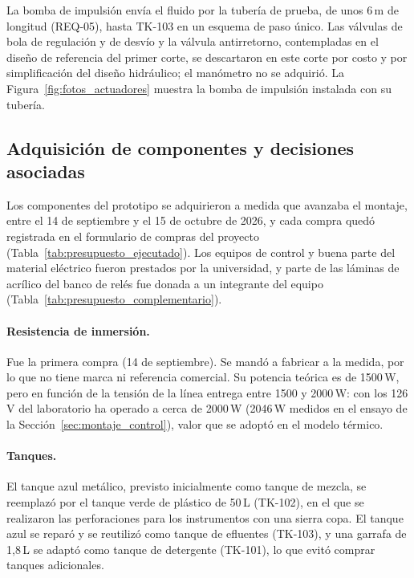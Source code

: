  La bomba de impulsión envía el fluido por la tubería de prueba, de unos 6\,m de longitud (REQ-05), hasta TK-103 en un esquema de paso único. Las válvulas de bola de regulación y de desvío y la válvula antirretorno, contempladas en el diseño de referencia del primer corte, se descartaron en este corte por costo y por simplificación del diseño hidráulico; el manómetro no se adquirió. La Figura~\ref{fig:fotos_actuadores} muestra la bomba de impulsión instalada con su tubería.
\subsection{Adquisición de componentes y decisiones asociadas}\label{sec:montaje_adquisiciones}

Los componentes del prototipo se adquirieron a medida que avanzaba el montaje, entre el 14 de septiembre y el 15 de octubre de 2026, y cada compra quedó registrada en el formulario de compras del proyecto (Tabla~\ref{tab:presupuesto_ejecutado}). Los equipos de control y buena parte del material eléctrico fueron prestados por la universidad, y parte de las láminas de acrílico del banco de relés fue donada a un integrante del equipo (Tabla~\ref{tab:presupuesto_complementario}).

\paragraph{Resistencia de inmersión.} Fue la primera compra (14 de septiembre). Se mandó a fabricar a la medida, por lo que no tiene marca ni referencia comercial. Su potencia teórica es de 1500\,W, pero en función de la tensión de la línea entrega entre 1500 y 2000\,W: con los 126\,V del laboratorio ha operado a cerca de 2000\,W (2046\,W medidos en el ensayo de la Sección~\ref{sec:montaje_control}), valor que se adoptó en el modelo térmico.

\paragraph{Tanques.} El tanque azul metálico, previsto inicialmente como tanque de mezcla, se reemplazó por el tanque verde de plástico de 50\,L (TK-102), en el que se realizaron las perforaciones para los instrumentos con una sierra copa. El tanque azul se reparó y se reutilizó como tanque de efluentes (TK-103), y una garrafa de 1,8\,L se adaptó como tanque de detergente (TK-101), lo que evitó comprar tanques adicionales.

